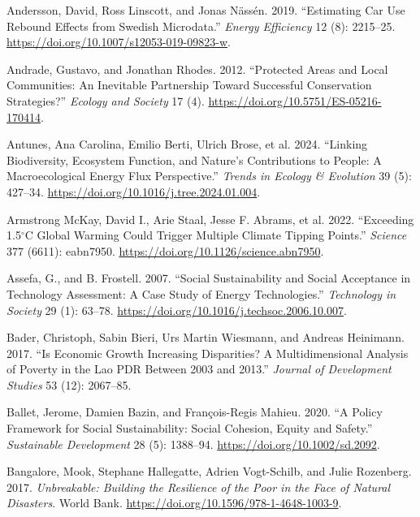 \documentclass[
  a4paper,
  DIV=11,
  numbers=noendperiod,
  oneside,
  openany]{scrreprt}
\newlength{\cslhangindent}
\newenvironment{CSLReferences}[2] %
 {\begin{list}{}{%
  \setlength{\itemindent}{0pt}
  \setlength{\leftmargin}{0pt}
  \setlength{\parsep}{0pt}
  \ifodd #1
   \setlength{\leftmargin}{\cslhangindent}
   \setlength{\itemindent}{-1\cslhangindent}
  \fi
  \setlength{\itemsep}{#2\baselineskip}}}
 {\end{list}}
\begin{document}
\begin{CSLReferences}{1}{1}
Andersson, David, Ross Linscott, and Jonas Nässén. 2019. {``Estimating
Car Use Rebound Effects from {Swedish} Microdata.''} \emph{Energy
Efficiency} 12 (8): 2215--25.
\url{https://doi.org/10.1007/s12053-019-09823-w}.

Andrade, Gustavo, and Jonathan Rhodes. 2012. {``Protected {Areas} and
{Local Communities}: An {Inevitable Partnership} Toward {Successful
Conservation Strategies}?''} \emph{Ecology and Society} 17 (4).
\url{https://doi.org/10.5751/ES-05216-170414}.

Antunes, Ana Carolina, Emilio Berti, Ulrich Brose, et al. 2024.
{``Linking Biodiversity, Ecosystem Function, and {Nature}'s
Contributions to People: A Macroecological Energy Flux Perspective.''}
\emph{Trends in Ecology \& Evolution} 39 (5): 427--34.
\url{https://doi.org/10.1016/j.tree.2024.01.004}.

Armstrong McKay, David I., Arie Staal, Jesse F. Abrams, et al. 2022.
{``Exceeding 1.5{\(^\circ\)}{C} Global Warming Could Trigger Multiple
Climate Tipping Points.''} \emph{Science} 377 (6611): eabn7950.
\url{https://doi.org/10.1126/science.abn7950}.

Assefa, G., and B. Frostell. 2007. {``Social Sustainability and Social
Acceptance in Technology Assessment: {A} Case Study of Energy
Technologies.''} \emph{Technology in Society} 29 (1): 63--78.
\url{https://doi.org/10.1016/j.techsoc.2006.10.007}.

Bader, Christoph, Sabin Bieri, Urs Martin Wiesmann, and Andreas
Heinimann. 2017. {``Is Economic Growth Increasing Disparities? {A}
Multidimensional Analysis of Poverty in the {Lao PDR} Between 2003 and
2013.''} \emph{Journal of Development Studies} 53 (12): 2067--85.

Ballet, Jerome, Damien Bazin, and François-Regis Mahieu. 2020. {``A
Policy Framework for Social Sustainability: {Social} Cohesion, Equity
and Safety.''} \emph{Sustainable Development} 28 (5): 1388--94.
\url{https://doi.org/10.1002/sd.2092}.

Bangalore, Mook, Stephane Hallegatte, Adrien Vogt-Schilb, and Julie
Rozenberg. 2017. \emph{Unbreakable: {Building} the {Resilience} of the
{Poor} in the {Face} of {Natural Disasters}}. World Bank.
\url{https://doi.org/10.1596/978-1-4648-1003-9}.


\end{CSLReferences}
\end{document}

